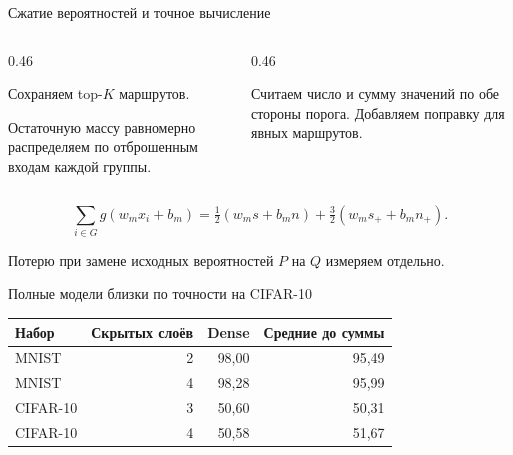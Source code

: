 \documentclass[aspectratio=169,11pt]{beamer}
\begin{document}
\begin{frame}[t]{Сжатие вероятностей и точное вычисление}
\slidebody
\begin{columns}[T,onlytextwidth]
\begin{column}{0.46\textwidth}
\par\vspace{0.12cm}
Сохраняем top-$K$ маршрутов.\par
Остаточную массу равномерно распределяем по отброшенным входам каждой группы.
\end{column}
\begin{column}{0.46\textwidth}
\par\vspace{0.12cm}
Считаем число и сумму значений по обе стороны порога. Добавляем поправку для явных маршрутов.
\end{column}
\end{columns}
\vspace{0.23cm}
\[
 \sum_{i\in G} g(w_mx_i+b_m)
 =\tfrac12(w_ms+b_mn)+\tfrac32(w_ms_++b_mn_+).
\]
\vspace{0.15cm}
\par
Потерю при замене исходных вероятностей $P$ на $Q$ измеряем отдельно.
\end{frame}

\begin{frame}[t]{Полные модели близки по точности на CIFAR-10}
\slidebody
\renewcommand{\arraystretch}{1.36}
\begin{tabularx}{\textwidth}{@{}Xrrr@{}}
\toprule
\textbf{Набор} & \textbf{Скрытых слоёв} & \textbf{Dense} & \textbf{Средние до суммы} \\
\midrule
MNIST & 2 & 98,00 & 95,49 \\
MNIST & 4 & 98,28 & 95,99 \\
CIFAR-10 & 3 & 50,60 & 50,31 \\
CIFAR-10 & 4 & 50,58 & 51,67 \\
\bottomrule
\end{tabularx}
\end{frame}
\end{document}
